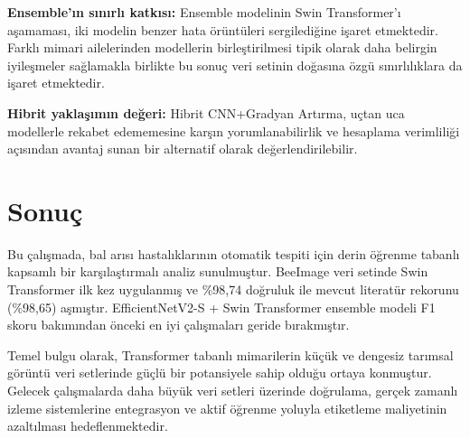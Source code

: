 \documentclass[conference]{IEEEtran}
\begin{document}
\textbf{Ensemble'ın sınırlı katkısı:} Ensemble modelinin Swin Transformer'ı aşamaması, iki modelin benzer hata örüntüleri sergilediğine işaret etmektedir. Farklı mimari ailelerinden modellerin birleştirilmesi tipik olarak daha belirgin iyileşmeler sağlamakla birlikte bu sonuç veri setinin doğasına özgü sınırlılıklara da işaret etmektedir.

\textbf{Hibrit yaklaşımın değeri:} Hibrit CNN+Gradyan Artırma, uçtan uca modellerle rekabet edememesine karşın yorumlanabilirlik ve hesaplama verimliliği açısından avantaj sunan bir alternatif olarak değerlendirilebilir.

\section{Sonuç}

Bu çalışmada, bal arısı hastalıklarının otomatik tespiti için derin öğrenme tabanlı kapsamlı bir karşılaştırmalı analiz sunulmuştur. BeeImage veri setinde Swin Transformer ilk kez uygulanmış ve \%98,74 doğruluk ile mevcut literatür rekorunu (\%98,65) aşmıştır. EfficientNetV2-S + Swin Transformer ensemble modeli F1 skoru bakımından önceki en iyi çalışmaları geride bırakmıştır.

Temel bulgu olarak, Transformer tabanlı mimarilerin küçük ve dengesiz tarımsal görüntü veri setlerinde güçlü bir potansiyele sahip olduğu ortaya konmuştur. Gelecek çalışmalarda daha büyük veri setleri üzerinde doğrulama, gerçek zamanlı izleme sistemlerine entegrasyon ve aktif öğrenme yoluyla etiketleme maliyetinin azaltılması hedeflenmektedir.

\end{document}
